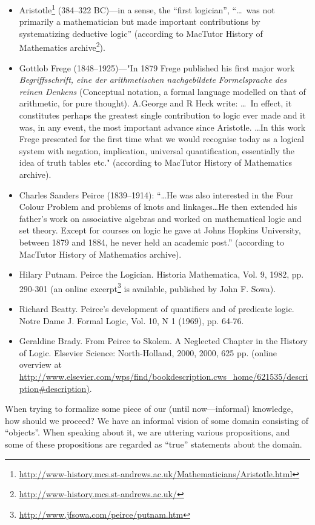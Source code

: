 \begin{itemize}
    \item Aristotle\footnote{\url{http://www-history.mcs.st-andrews.ac.uk/Mathematicians/Aristotle.html}} (384--322 BC)---in a sense, the ``first logician'', ``\ldots~was not primarily a mathematician but made important contributions by systematizing deductive logic'' (according to MacTutor History of Mathematics archive\footnote{\url{http://www-history.mcs.st-andrews.ac.uk/}}).
    \item Gottlob Frege (1848--1925)---"In 1879 Frege published his first major work \emph{Begriffsschrift, eine der arithmetischen nachgebildete Formelsprache des reinen Denkens} (Conceptual notation, a formal language modelled on that of arithmetic, for pure thought).
    A.George and R Heck write: \ldots~In effect, it constitutes perhaps the greatest single contribution to logic ever made and it was, in any event, the most important advance since Aristotle.
    \ldots  In this work Frege presented for the first time what we would recognise today as a logical system with negation, implication, universal quantification, essentially the idea of truth tables etc." (according to MacTutor History of Mathematics archive).
\item Charles Sanders Peirce (1839--1914): ``\ldots  He was also interested in the Four Colour Problem and problems of knots and linkages\ldots  He then extended his father's work on associative algebras and worked on mathematical logic and set theory. Except for courses on logic he gave at Johns Hopkins University, between 1879 and 1884, he never held an academic post.'' (according to MacTutor History of Mathematics archive).
\item Hilary Putnam. Peirce the Logician. Historia Mathematica, Vol. 9, 1982, pp. 290-301 (an online excerpt\footnote{\url{http://www.jfsowa.com/peirce/putnam.htm}} is available, published by John F. Sowa).
\item Richard Beatty. Peirce's development of quantifiers and of predicate logic. Notre Dame J. Formal Logic, Vol. 10, N 1 (1969), pp. 64-76.
\item Geraldine Brady. From Peirce to Skolem. A Neglected Chapter in the History of Logic. Elsevier Science: North-Holland, 2000, 2000, 625 pp. (online overview at \url{http://www.elsevier.com/wps/find/bookdescription.cws\_home/621535/description\#description)}.
\end{itemize}

When trying to formalize some piece of our (until now---informal) knowledge, how should we proceed?
We have an informal vision of some domain consisting of ``objects''.
When speaking about it, we are uttering various propositions, and some of these propositions are regarded as ``true'' statements about the domain.

